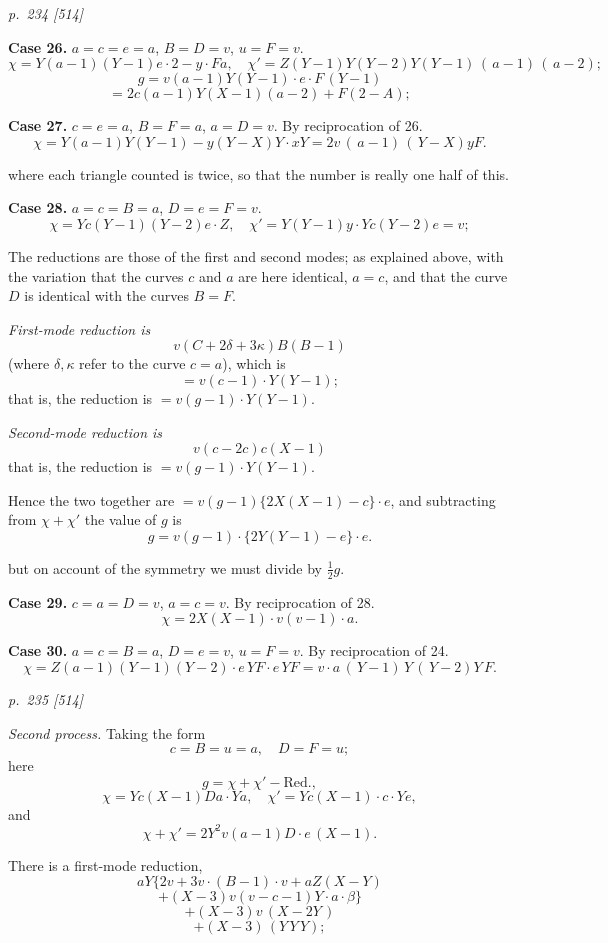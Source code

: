 \documentclass[11pt,a4paper]{article}
\theoremstyle{plain}
\theoremstyle{definition}
\begin{document}
\clearpage

\bigskip
\textit{p.~234 [514]}
\smallskip

\textbf{Case 26.}  $a=c=e=a$, $B=D=v$, $u=F=v$.
\[
\chi=Y(a-1)(Y-1)e\cdot 2-y\cdot Fa, \quad \chi'=Z(Y-1)Y(Y-2)Y(Y-1)\,(\,a-1)\,(\,a-2);
\]
\[
g=v(a-1)Y(Y-1)\cdot e\cdot F\,(Y-1)
\]
\[
=2c(a-1)Y(X-1)(a-2)+F(2-A);
\]

\textbf{Case 27.}  $c=e=a$, $B=F=a$, $a=D=v$.  By reciprocation of 26.
\[
\chi=Y(a-1)Y(Y-1)-y(Y-X)Y\cdot xY=2v\,(\,a-1)\,(\,Y-X)yF.
\]

where each triangle counted is twice, so that the number is really one half of this.

\textbf{Case 28.}  $a=c=B=a$, $D=e=F=v$.
\[
\chi=Yc(Y-1)(Y-2)e\cdot Z, \quad \chi'=Y(Y-1)y\cdot Yc(Y-2)e=v;
\]

The reductions are those of the first and second modes; as explained above, with
the variation that the curves $c$ and $a$ are here identical, $a=c$, and that the curve $D$
is identical with the curves $B=F$.

\textit{First-mode reduction is}
\[
v(C+2\delta+3\kappa)B(B-1)
\]
(where $\delta, \kappa$ refer to the curve $c=a$), which is
\[
=v(c-1)\cdot Y(Y-1);
\]
that is, the reduction is $=v(g-1)\cdot Y(Y-1)$.

\textit{Second-mode reduction is}
\[
v(c-2c)c(X-1)
\]
that is, the reduction is $=v(g-1)\cdot Y(Y-1)$.

Hence the two together are $=v(g-1)\{2X(X-1)-c\}\cdot e$, and subtracting from
$\chi+\chi'$ the value of $g$ is
\[
g=v(g-1)\cdot \{2Y(Y-1)-e\}\cdot e.
\]

but on account of the symmetry we must divide by $\frac{1}{2}g$.

\textbf{Case 29.}  $c=a=D=v$, $a=c=v$.  By reciprocation of 28.
\[
\chi=2X(X-1)\cdot v(v-1)\cdot a.
\]

\textbf{Case 30.}  $a=c=B=a$, $D=e=v$, $u=F=v$.  By reciprocation of 24.
\[
\chi=Z(a-1)(Y-1)(Y-2)\cdot e\,YF\cdot e\,YF=v\cdot a\,(\,Y-1)\,Y\,(\,Y-2)Y\,F.
\]

\clearpage

\bigskip
\textit{p.~235 [514]}
\smallskip

\textit{Second process.}  Taking the form
\[
c=B=u=a, \quad D=F=u;
\]
here
\[
g=\chi+\chi'-\text{Red.},
\]
\[
\chi=Yc(X-1)Da\cdot Ya, \quad \chi'=Yc(X-1)\cdot c\cdot Ye,
\]
and
\[
\chi+\chi'=2Y^2v(a-1)D\cdot e\,(X-1).
\]

There is a first-mode reduction,
\[
aY\{2v+3v\cdot (B-1)\cdot v+aZ(X-Y)
\]
\[
+(X-3)v(v-c-1)Y\cdot a\cdot \beta\}
\]
\[
+(X-3)v\,(X-2Y\,)
\]
\[
+(X-3)\,(Y\,Y\,Y);
\]
\end{document}
